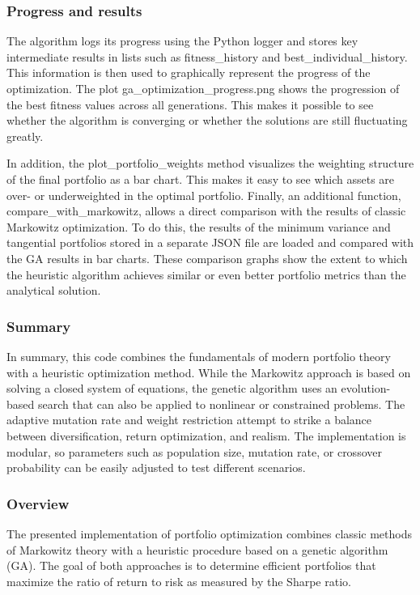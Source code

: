 \documentclass{agasthesis}
\begin{document}
\subsubsection{Progress and results}
The algorithm logs its progress using the Python logger and stores key intermediate results in lists such as fitness_history and best_individual_history. 
This information is then used to graphically represent the progress of the optimization. The plot ga_optimization_progress.png shows the progression of the 
best fitness values across all generations. This makes it possible to see whether the algorithm is converging or whether the solutions are still fluctuating greatly.

In addition, the plot_portfolio_weights method visualizes the weighting structure of the final portfolio as a bar chart. This makes it easy to see which assets are over- 
or underweighted in the optimal portfolio. Finally, an additional function, compare_with_markowitz, allows a direct comparison with the results of classic Markowitz optimization. 
To do this, the results of the minimum variance and tangential portfolios stored in a separate JSON file are loaded and compared with the GA results in bar charts. These comparison 
graphs show the extent to which the heuristic algorithm achieves similar or even better portfolio metrics than the analytical solution.
\subsubsection{Summary}
In summary, this code combines the fundamentals of modern portfolio theory with a heuristic optimization method. While the Markowitz approach 
is based on solving a closed system of equations, the genetic algorithm uses an evolution-based search that can also be applied to nonlinear or 
constrained problems. The adaptive mutation rate and weight restriction attempt to strike a balance between diversification, return optimization, 
and realism. The implementation is modular, so parameters such as population size, mutation rate, or crossover probability can be easily adjusted to test different scenarios.
\subsubsection{Overview}
The presented implementation of portfolio optimization combines classic methods of Markowitz theory with a heuristic procedure based on a genetic algorithm (GA). 
The goal of both approaches is to determine efficient portfolios that maximize the ratio of return to risk as measured by the Sharpe ratio.
\end{document}
